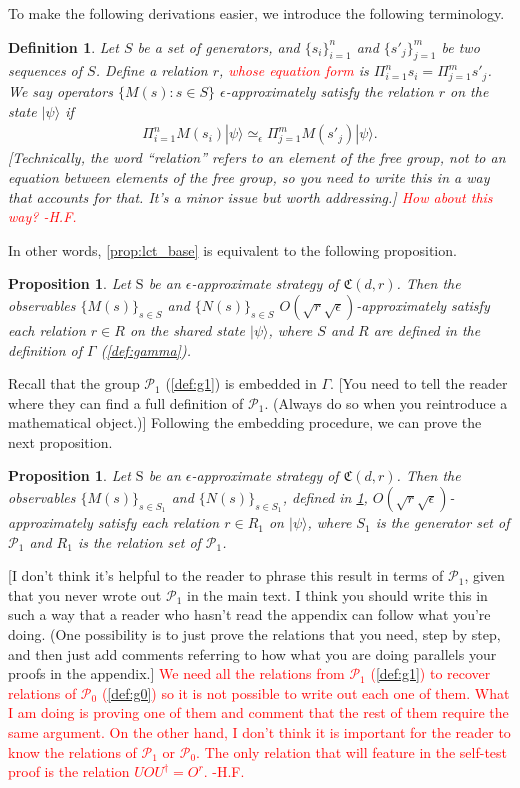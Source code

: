 \documentclass[11pt,letterpaper]{article}
\newcommand{\ket}[1]{|#1\rangle}
\newcommand{\ct}{^{\dagger}}
\newcommand{\1}{\mathbb{1}}
\newcommand{\Pg}{\mathcal{P}}
\newcommand{\fC}{\mathfrak{C}}
\newcommand{\bS}{\mathrm{S}}
\newcommand{\ep}{\epsilon}
\newcommand{\se}{\sqrt{\epsilon}}
\newcommand{\sr}{\sqrt{r}}
\newcommand{\appd}[1]{\simeq_{#1}}
\def\carl#1{{\color{blue} #1}}
\newcommand{\hf}[1]{\textcolor{red}{#1}}
\newcommand{\hfc}[1]{\textcolor{red}{#1 -H.F.}}
\newtheorem{proposition}[theorem]{Proposition}
\newtheorem{definition}[theorem]{Definition}
\theoremstyle{definition}
\begin{document}
To make the following derivations easier, we introduce the following terminology.
\begin{definition}
    Let $S$ be a set of generators, and $\{s_i\}_{i=1}^n$ and $\{s'_j\}_{j=1}^m$
    be two sequences of $S$.
    Define a relation $r$, \hf{whose equation form} is $\Pi_{i=1}^n s_i = \Pi_{j=1}^m s'_j$.
    We say operators $\{M(s) : s \in S\}$ $\ep$-approximately satisfy the relation
    $r$ on the state $\ket{\psi}$ if 
    \begin{align*}
        \Pi_{i=1}^n M(s_i)\ket{\psi} \appd{\ep} \Pi_{j=1}^m M(s'_j) \ket{\psi}. 
    \end{align*}
\carl{[Technically, the word ``relation'' refers to an element of the free group, not to an equation between elements of the free group, so you need to write this in a way that accounts for that.  It's a minor issue but worth addressing.]}
\hfc{How about this way?}
\end{definition}
In other words, \cref{prop:lct_base} is equivalent to the following proposition.
\begin{proposition}
    \label{prop:lct_group}
    Let $\bS$ be an $\ep$-approximate strategy of $\fC(d,r)$.
	Then the observables $\{ M(s) \}_{s \in S}$ and
	$\{N(s)\}_{s \in S}$ $O(\sr \se)$-approximately satisfy
	each relation $r \in R$ on the shared state $\ket{\psi}$, 
	where $S$ and $R$ are defined in the definition of $\Gamma$ 
	(\cref{def:gamma}).	
\end{proposition}
Recall that the group $\Pg_1$ (\cref{def:g1}) is embedded in $\Gamma$.  \carl{[You need to tell the reader where they can find a full definition of $\Pg_1$. (Always do so when you reintroduce a mathematical object.)]}
Following the embedding procedure, we can prove the next proposition.
\begin{proposition}
    \label{prop:lct_pg1}
    Let $\bS$ be an $\ep$-approximate strategy of $\fC(d,r)$.
	Then the observables $\{ M(s) \}_{s \in S_1}$ and
	$\{N(s)\}_{s \in S_1}$, defined in 
\cref{prop:lct_group}, $O(\sr\se)$-approximately satisfy
	each relation $r \in R_1$ on $\ket{\psi}$, 
	where $S_1$ is the generator set of $\Pg_1$
    and $R_1$ is the relation set of $\Pg_1$.	
\end{proposition}

\carl{[I don't think it's helpful
to the reader to phrase this result in terms of $\Pg_1$, given that you never wrote out $\Pg_1$ in the main text.  I think you should write this in such a way that a reader who hasn't read the appendix can follow what you're doing.  (One possibility is to just prove the relations that you need, step by step, and then just add comments referring to how what you are doing parallels your proofs in the appendix.]}
\hfc{We need all the relations from $\Pg_1$ (\cref{def:g1}) to recover relations of $\Pg_0$ (\cref{def:g0})
so it is not possible to write out each one of them. 
What I am doing is proving one of them and comment that the rest of them require the same argument.
On the other hand, I don't think it is important for the reader to know the relations of $\Pg_1$
or $\Pg_0$. The only relation that will feature in the self-test proof is the relation $UOU\ct = O^r$.}
\end{document}
